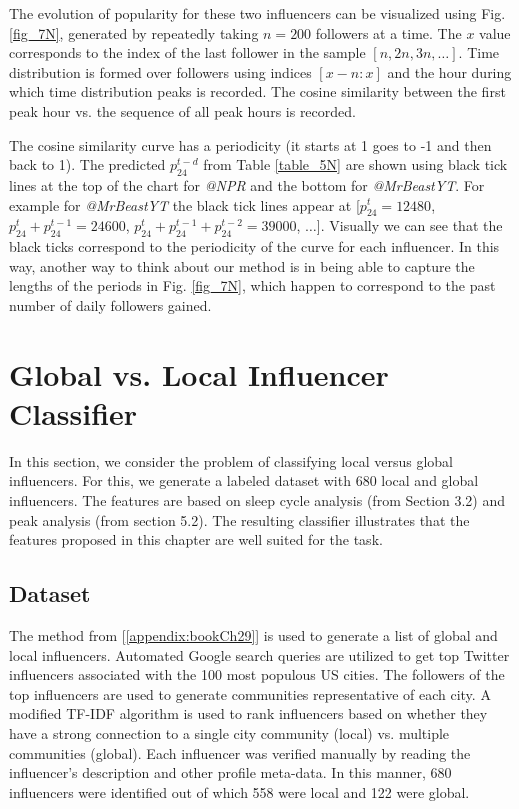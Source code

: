 The evolution of popularity for these two influencers can be visualized %
using Fig. \ref{fig_7N}, %
generated by repeatedly taking $n=200$ followers at a time. The $x$ value corresponds to the index of the last follower in the sample $[n, 2n, 3n,\ldots]$. Time distribution is formed over followers using indices $[x-n:x]$ and the hour during which time distribution peaks is recorded. The cosine similarity between the first peak hour vs. the sequence of all peak hours is recorded. 

The cosine similarity curve has a periodicity (it starts at 1 goes to -1 and then back to 1). The predicted $p_{24}^{t-d}$ from Table \ref{table_5N} %
are shown using black tick lines at the top of the chart for \emph{@NPR} and the bottom for \emph{@MrBeastYT}. For example for \emph{@MrBeastYT} the black tick lines appear at [$p_{24}^{t}=12480$, $p_{24}^{t}+p_{24}^{t-1}=24600$, $p_{24}^{t}+p_{24}^{t-1}+p_{24}^{t-2} = 39000$, $\ldots$]. Visually we can see that the black ticks correspond to the periodicity of the curve for each influencer. In this way, another way to think about our method is in being able to capture the lengths of the periods in Fig. \ref{fig_7N}, which happen to correspond to the past number of daily followers gained. 

\section{Global vs. Local Influencer Classifier} \label{sec6}

In this section, we consider the problem of classifying local versus global influencers. For this, we generate a labeled dataset with 680 local and global influencers. The features are based on sleep cycle analysis (from Section 3.2) and peak analysis (from section 5.2). The resulting classifier illustrates that the features proposed in this chapter are well suited for the task.

\subsection{Dataset}

The method from [\ref{appendix:bookCh29}] is used to generate a list of global and local influencers. Automated Google search queries are utilized to get top Twitter influencers associated with the 100 most populous US cities. The followers of the top influencers are used to generate communities representative of each city. A modified TF-IDF algorithm is used to rank influencers based on whether they have a strong connection to a single city community (local) vs. multiple communities (global). Each influencer was verified manually by reading the influencer's description and other profile meta-data. In this manner, 680 influencers  were identified out of which 558 were local and 122 were global. 

